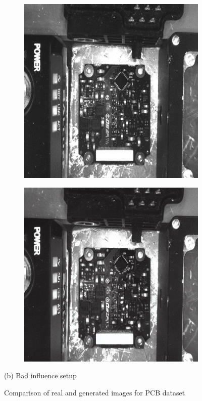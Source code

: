 \documentclass[12pt,DIV14,BCOR12mm,a4paper,footinclude=false,headinclude,parskip=half-,twoside,openright,cleardoublepage=empty,toc=index,bibliography=totoc,listof=totoc]{scrreprt}
\numberwithin{equation}{chapter}
\begin{document}
\begin{figure}
    \begin{subfigure}[t]{0.45\textwidth}
        \centering
        \includegraphics[width=\textwidth]{../media/diff_pcb_bad_real.png}
    \end{subfigure}%
    \hspace{0.02\textwidth}
    \begin{subfigure}[t]{0.45\textwidth}
        \centering
        \includegraphics[width=\textwidth]{../media/diff_pcb_bad_fake.png}
    \end{subfigure}
    \caption*{(b) Bad influence setup}

    \caption{Comparison of real and generated images for PCB dataset}
    \label{fig:generated_images_pcb}
\end{figure}
\end{document}
